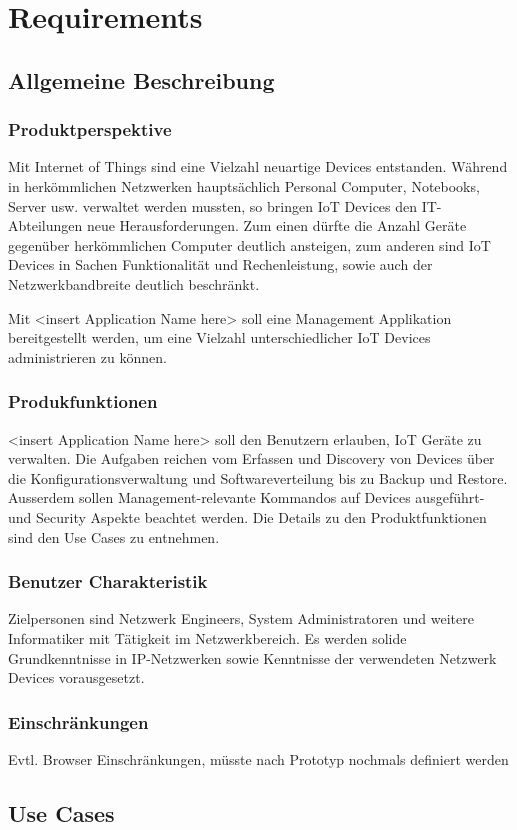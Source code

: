 \chapter{Requirements}
\section{Allgemeine Beschreibung}
\subsection{Produktperspektive}
Mit Internet of Things sind eine Vielzahl neuartige Devices entstanden. Während in herkömmlichen Netzwerken hauptsächlich Personal Computer, Notebooks, Server usw. verwaltet werden mussten, so bringen IoT Devices den IT-Abteilungen neue Herausforderungen. Zum einen dürfte die Anzahl Geräte gegenüber herkömmlichen Computer deutlich ansteigen, zum anderen sind IoT Devices in Sachen Funktionalität und Rechenleistung, sowie auch der Netzwerkbandbreite deutlich beschränkt. 

Mit <insert Application Name here> soll eine Management Applikation bereitgestellt werden, um eine Vielzahl unterschiedlicher IoT Devices administrieren zu können. 
\subsection{Produkfunktionen}
<insert Application Name here> soll den Benutzern erlauben, IoT Geräte zu verwalten. Die Aufgaben reichen vom Erfassen und Discovery von Devices über die Konfigurationsverwaltung und Softwareverteilung bis zu Backup und Restore. Ausserdem sollen Management-relevante Kommandos auf Devices ausgeführt- und Security Aspekte beachtet werden. Die Details zu den Produktfunktionen sind den Use Cases zu entnehmen.

\subsection{Benutzer Charakteristik}
Zielpersonen sind Netzwerk Engineers, System Administratoren und weitere Informatiker mit Tätigkeit im Netzwerkbereich. Es werden solide Grundkenntnisse in IP-Netzwerken sowie Kenntnisse der verwendeten Netzwerk Devices vorausgesetzt. 
\subsection{Einschränkungen}
Evtl. Browser Einschränkungen, müsste nach Prototyp nochmals definiert werden
\section{Use Cases}
